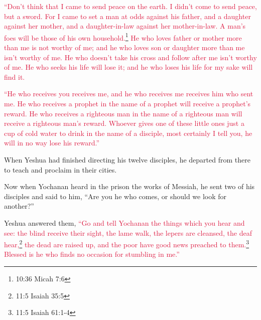 \myverse{}\textcolor{crimson}{“Don’t think that I came to send peace on the earth. I didn’t
	come to send peace, but a sword.
}
\myverse{}\textcolor{crimson}{For I came to set a man at odds against his father, and a daughter against
	her mother, and a daughter-in-law against her mother-in-law.
}
\myverse{}\textcolor{crimson}{A man’s foes will be those of his own household.}\footnote{10:36 Micah 7:6}
\myverse{}\textcolor{crimson}{He who loves father or mother more than me is not worthy of me; and he
	who loves son or daughter more than me isn’t worthy of me.
}
\myverse{}\textcolor{crimson}{He who doesn’t take his cross and follow after me isn’t worthy of me.
}
\myverse{}\textcolor{crimson}{He who seeks his life will lose it; and he who loses his life for my
	sake will find it.
}

\myverse{}\textcolor{crimson}{“He who receives you receives me, and he who receives me
	receives him who sent me.
}
\myverse{}\textcolor{crimson}{He who receives a prophet in the name of a prophet will receive a prophet’s
	reward. He who receives a righteous man in the name of a righteous man will receive a righteous man’s
	reward.
}
\myverse{}\textcolor{crimson}{Whoever gives one of these little ones just a cup of cold water to drink
	in the name of a disciple, most certainly I tell you, he will in no way lose his reward.”}


\mychapter{} \myverse*{}When Yeshua had finished directing his twelve disciples, he departed
from there to teach and proclaim in their cities.

\myverse{}Now when Yochanan heard in the prison the works of Messiah, he
sent two of his disciples
\myverse{}and said to him, “Are you he who comes, or should we look for another?”

\myverse{}Yeshua answered them,
\textcolor{crimson}{“Go and tell Yochanan the things which you hear and see:
}
\myverse{}\textcolor{crimson}{the blind receive their sight, the lame walk, the lepers are cleansed,
	the deaf hear,}\footnote{11:5 Isaiah 35:5}
\textcolor{crimson}{the dead are raised up, and the poor have good news preached to them.}\footnote{11:5 Isaiah 61:1-4}
\myverse{}\textcolor{crimson}{Blessed is he who finds no occasion for stumbling in me.”}

